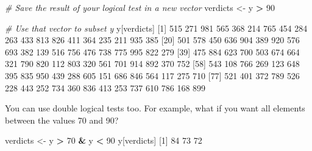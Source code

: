\documentclass[
]{book}
\newenvironment{Shaded}{\begin{snugshade}}{\end{snugshade}}
\newcommand{\CommentTok}[1]{\textcolor[rgb]{0.56,0.35,0.01}{\textit{#1}}}
\newcommand{\DecValTok}[1]{\textcolor[rgb]{0.00,0.00,0.81}{#1}}
\newcommand{\NormalTok}[1]{#1}
\newcommand{\OperatorTok}[1]{\textcolor[rgb]{0.81,0.36,0.00}{\textbf{#1}}}
\newcommand{\StringTok}[1]{\textcolor[rgb]{0.31,0.60,0.02}{#1}}
\begin{document}
\begin{Shaded}
\begin{Highlighting}[]
\CommentTok{# Save the result of your logical test in a new vector}
\NormalTok{verdicts <-}\StringTok{ }\NormalTok{y }\OperatorTok{>}\StringTok{ }\DecValTok{90}

\CommentTok{# Use that vector to subset y}
\NormalTok{y[verdicts]}
\NormalTok{ [}\DecValTok{1}\NormalTok{] }\DecValTok{515} \DecValTok{271} \DecValTok{981} \DecValTok{565} \DecValTok{368} \DecValTok{214} \DecValTok{765} \DecValTok{454} \DecValTok{284} \DecValTok{263} \DecValTok{433} \DecValTok{813} \DecValTok{826} \DecValTok{411} \DecValTok{364} \DecValTok{235} \DecValTok{211} \DecValTok{935} \DecValTok{385}
\NormalTok{[}\DecValTok{20}\NormalTok{] }\DecValTok{501} \DecValTok{578} \DecValTok{450} \DecValTok{636} \DecValTok{904} \DecValTok{389} \DecValTok{920} \DecValTok{576} \DecValTok{693} \DecValTok{382} \DecValTok{139} \DecValTok{516} \DecValTok{756} \DecValTok{476} \DecValTok{738} \DecValTok{775} \DecValTok{995} \DecValTok{822} \DecValTok{279}
\NormalTok{[}\DecValTok{39}\NormalTok{] }\DecValTok{475} \DecValTok{884} \DecValTok{623} \DecValTok{700} \DecValTok{503} \DecValTok{674} \DecValTok{664} \DecValTok{321} \DecValTok{790} \DecValTok{820} \DecValTok{112} \DecValTok{803} \DecValTok{320} \DecValTok{561} \DecValTok{701} \DecValTok{914} \DecValTok{892} \DecValTok{370} \DecValTok{752}
\NormalTok{[}\DecValTok{58}\NormalTok{] }\DecValTok{543} \DecValTok{108} \DecValTok{766} \DecValTok{269} \DecValTok{123} \DecValTok{648} \DecValTok{395} \DecValTok{835} \DecValTok{950} \DecValTok{439} \DecValTok{288} \DecValTok{605} \DecValTok{151} \DecValTok{686} \DecValTok{846} \DecValTok{564} \DecValTok{117} \DecValTok{275} \DecValTok{710}
\NormalTok{[}\DecValTok{77}\NormalTok{] }\DecValTok{521} \DecValTok{401} \DecValTok{372} \DecValTok{789} \DecValTok{526} \DecValTok{228} \DecValTok{443} \DecValTok{252} \DecValTok{734} \DecValTok{360} \DecValTok{836} \DecValTok{413} \DecValTok{253} \DecValTok{737} \DecValTok{610} \DecValTok{786} \DecValTok{168} \DecValTok{899}
\end{Highlighting}
\end{Shaded}

You can use double logical tests too. For example, what if you want all elements between the values 70 and 90?

\begin{Shaded}
\begin{Highlighting}[]
\NormalTok{verdicts <-}\StringTok{ }\NormalTok{y }\OperatorTok{>}\StringTok{ }\DecValTok{70} \OperatorTok{&}\StringTok{ }\NormalTok{y }\OperatorTok{<}\StringTok{ }\DecValTok{90}
\NormalTok{y[verdicts]}
\NormalTok{[}\DecValTok{1}\NormalTok{] }\DecValTok{84} \DecValTok{73} \DecValTok{72}
\end{Highlighting}
\end{Shaded}
\end{document}
